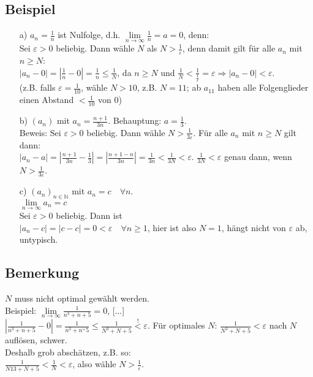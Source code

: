\documentclass[12pt, titlepage]{article}
\newcommand{\N}{\mathds{N}}
\newcommand{\infn}{n\rightarrow\infty}
\renewcommand{\*}{\cdot}
\renewcommand{\epsilon}{\varepsilon}
\begin{document}
	\subsection{Beispiel}
	\begin{itemize}
		\item[a)] $a_n=\frac{1}{n}$ ist Nulfolge, d.h. $\lim\limits_{\infn}\frac{1}{n}=a=0$, denn:\\
		Sei $\epsilon>0$ beliebig. Dann wähle $N$ als $N>\frac{1}{\epsilon}$, denn damit gilt für alle $a_n$ mit $n\geq N$:\\
		$|a_n-0|=|\frac{1}{n}-0|=\frac{1}{n}\leq\frac{1}{N}$, da $n\geq N$ und $\frac{1}{N}<\frac{1}{\frac{1}{\epsilon}}=\epsilon\Rightarrow|a_n-0|<\epsilon$.\\
		(z.B. falls $\epsilon=\frac{1}{10}$, wähle $N>10$, z.B. $N=11$; ab $a_{11}$ haben alle Folgenglieder einen Abstand $<\frac{1}{10}$ von 0)
		\item[b)] $(a_n)$ mit $a_n=\frac{n+1}{3n}$. Behauptung: $a=\frac{1}{3}$.\\
		Beweis: Sei $\epsilon>0$ beliebig. Dann wähle $N>\frac{1}{3\epsilon}$. Für alle $a_n$ mit $n\geq N$ gilt dann:\\
		$|a_n-a|=|\frac{n+1}{3n}-\frac{1}{3}|=|\frac{n+1-n}{3n}|=\frac{1}{3n}<\frac{1}{3N}<\epsilon$. $\frac{1}{3N}<\epsilon$ genau dann, wenn $N>\frac{1}{3\epsilon}$.
		\item[c)] $(a_n)_{n\in\N}$ mit $a_n=c\quad\forall n$.\\
		$\lim\limits_{\infn}a_n=c$\\
		Sei $\epsilon>0$ beliebig. Dann ist\\
		$|a_n-c|=|c-c|=0<\epsilon\quad\forall n\geq1$, hier ist also $N=1$, hängt nicht von $\epsilon$ ab, untypisch.
	\end{itemize}
	\subsection{Bemerkung}
	$N$ muss nicht optimal gewählt werden.\\
	Beispiel: $\lim\limits_{\infn}\frac{1}{n^3+n+5}=0$, [...]\\
	$|\frac{1}{n^3+n+5}-0|=\frac{1}{n^3+n^+5}\leq\frac{1}{N^3+N+5}\overset{!}{<}\epsilon$. Für optimales $N$: $\frac{1}{N^3+N+5}<\epsilon$ nach $N$ auflösen, schwer.\\
	Deshalb grob abschätzen, z.B. so:\\
	$\frac{1}{N13+N+5}<\frac{1}{N}<\epsilon$, also wähle $N>\frac{1}{\epsilon}$.
\end{document}
